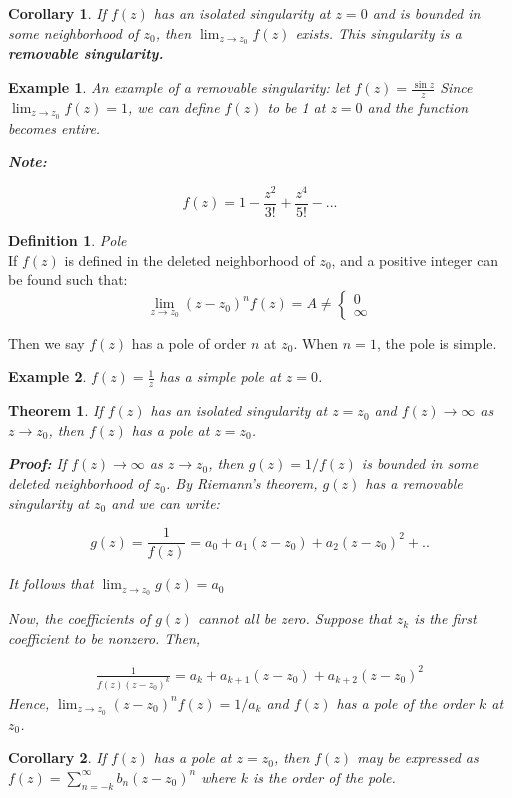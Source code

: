 \documentclass{article}
\newtheorem{theorem}{Theorem}[section]
\newtheorem{corollary}{Corollary}
\newtheorem{ex}{Example}
\theoremstyle{definition}
\newtheorem{definition}{Definition}[section]
\newcommand{\Def}[2]{
\begin{shaded*}
\begin{definition}{\textit{#1}}\\#2\end{definition}
\end{shaded*}
}
\begin{document}
\begin{corollary}
If $f(z)$ has an isolated singularity at $z=0$ and is bounded in some neighborhood of $z_0$, then $\lim_{z \to z_0}f(z)$ exists. This singularity is a \textbf{removable singularity.}
\end{corollary}

\begin{ex}
An example of a removable singularity: let $f(z) = \frac{\sin z}{z}$ Since $\lim_{z \to z_0}f(z) = 1$, we can define $f(z)$ to be 1 at $z=0$ and the function becomes entire. 

\textbf{Note:} 

$$f(z) = 1 - \frac{z^2}{3!} + \frac{z^4}{5!} - ... $$
\end{ex}

\Def{Pole}{If $f(z)$ is defined in the deleted neighborhood of $z_0$, and a positive integer can be found such that:
$$\lim_{z \to z_0} (z-z_0)^n f(z) = A \neq \begin{cases}
0 \\ \infty 
\end{cases}$$

Then we say $f(z)$ has a pole of order $n$ at $z_0$. When $n=1$, the pole is simple.}

\begin{ex}
$f(z) = \frac{1}{z}$ has a simple pole at $z=0$. 
\end{ex}

\begin{theorem}
If $f(z)$ has an isolated singularity at $z = z_0$ and $f(z) \to \infty$ as $z \to z_0$, then $f(z)$ has a pole at $z=z_0$.

\textbf{Proof:}
If $f(z) \to \infty$ as $z \to z_0$, then $g(z) = 1/f(z)$ is bounded in some deleted neighborhood of $z_0$. By Riemann's theorem, $g(z)$ has a removable singularity at $z_0$ and we can write:

$$g(z) = \frac{1}{f(z)} = a_0 + a_1(z-z_0) + a_2(z-z_0)^2 + ..$$

It follows that $\lim_{z \to z_0}g(z) = a_0$

Now, the coefficients of $g(z)$ cannot all be zero. Suppose that $z_k$ is the first coefficient to be nonzero. Then, 

\begin{align*}
\frac{1}{f(z)(z-z_0)^k} = a_k + a_{k+1}(z-z_0) + a_{k+2}(z-z_0)^2
\end{align*}
Hence, $\lim_{z \to z_0} (z-z_0)^n f(z) = 1/a_k$ and $f(z)$ has a pole of the order $k$ at $z_0$.
\end{theorem}
\begin{corollary}
If $f(z)$ has a pole at $z=z_0$, then $f(z)$ may be expressed as $f(z) = \sum_{n=-k}^{\infty} b_n(z-z_0)^n$ where $k$ is the order of the pole. 
\end{corollary}
\end{document}
